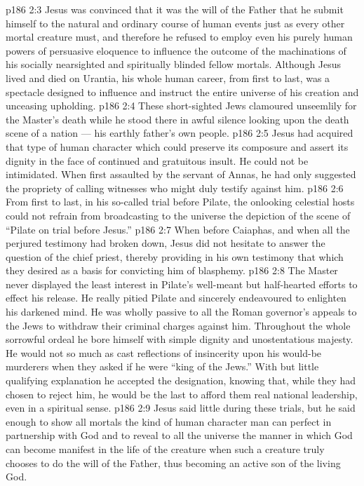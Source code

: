 \vs p186 2:3 Jesus was convinced that it was the will of the Father that he submit himself to the natural and ordinary course of human events just as every other mortal creature must, and therefore he refused to employ even his purely human powers of persuasive eloquence to influence the outcome of the machinations of his socially nearsighted and spiritually blinded fellow mortals. Although Jesus lived and died on Urantia, his whole human career, from first to last, was a spectacle designed to influence and instruct the entire universe of his creation and unceasing upholding.
\vs p186 2:4 \pc These short\hyp{}sighted Jews clamoured unseemlily for the Master’s death while he stood there in awful silence looking upon the death scene of a nation --- his earthly father’s own people.
\vs p186 2:5 \pc Jesus had acquired that type of human character which could preserve its composure and assert its dignity in the face of continued and gratuitous insult. He could not be intimidated. When first assaulted by the servant of Annas, he had only suggested the propriety of calling witnesses who might duly testify against him.
\vs p186 2:6 From first to last, in his so\hyp{}called trial before Pilate, the onlooking celestial hosts could not refrain from broadcasting to the universe the depiction of the scene of “Pilate on trial before Jesus.”
\vs p186 2:7 When before Caiaphas, and when all the perjured testimony had broken down, Jesus did not hesitate to answer the question of the chief priest, thereby providing in his own testimony that which they desired as a basis for convicting him of blasphemy.
\vs p186 2:8 The Master never displayed the least interest in Pilate’s well\hyp{}meant but half\hyp{}hearted efforts to effect his release. He really pitied Pilate and sincerely endeavoured to enlighten his darkened mind. He was wholly passive to all the Roman governor’s appeals to the Jews to withdraw their criminal charges against him. Throughout the whole sorrowful ordeal he bore himself with simple dignity and unostentatious majesty. He would not so much as cast reflections of insincerity upon his would\hyp{}be murderers when they asked if he were “king of the Jews.” With but little qualifying explanation he accepted the designation, knowing that, while they had chosen to reject him, he would be the last to afford them real national leadership, even in a spiritual sense.
\vs p186 2:9 Jesus said little during these trials, but he said enough to show all mortals the kind of human character man can perfect in partnership with God and to reveal to all the universe the manner in which God can become manifest in the life of the creature when such a creature truly chooses to do the will of the Father, thus becoming an active son of the living God.
